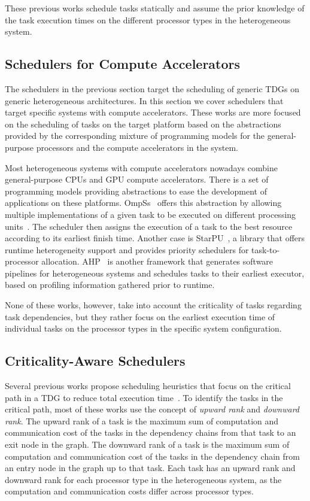 These previous works schedule tasks statically and assume the prior knowledge of the task execution times on the different processor types in the heterogeneous system.

\subsection{Schedulers for Compute Accelerators}

The schedulers in the previous section target the scheduling of generic TDGs on generic heterogeneous architectures. In this section we cover schedulers that target specific systems with compute accelerators. These works are more focused on the scheduling of tasks on the target platform based on the abstractions provided by the corresponding mixture of programming models for the general-purpose processors and the compute accelerators in the system.

Most heterogeneous systems with compute accelerators nowadays combine general-purpose CPUs and GPU compute accelerators. There is a set of programming models providing abstractions to ease the development of applications on these platforms. OmpSs~\cite{OmpSs_PPL11, OmpSs} offers this abstraction by allowing multiple implementations of a given task to be executed on different processing units~\cite{Judit}. The scheduler then assigns the execution of a task to the best resource according to its earliest finish time. Another case is StarPU~\cite{starpu}, a library that offers runtime heterogeneity support and provides priority schedulers for task-to-processor allocation. AHP~\cite{AHP} is another framework that generates software pipelines for heterogeneous systems and schedules tasks to their earliest executor, based on profiling information gathered prior to runtime.

None of these works, however, take into account the criticality of tasks regarding task dependencies, but they rather focus on the earliest execution time of individual tasks on the processor types in the specific system configuration.

\subsection{Criticality-Aware Schedulers}
\label{sec.relwork_critical}

Several previous works propose scheduling heuristics that focus on the critical path in a TDG to reduce total execution time~\cite{DCPS, LDCP, HEFT, CrPathDup}. To identify the tasks in the critical path, most of these works use the concept of \textit{upward rank} and \textit{downward rank}. The upward rank of a task is the maximum sum of computation and communication cost of the tasks in the dependency chains from that task to an exit node in the graph. The downward rank of a task is the maximum sum of computation and communication cost of the tasks in the dependency chain from an entry node in the graph up to that task. Each task has an upward rank and downward rank for each processor type in the heterogeneous system, as the computation and communication costs differ across processor types.

